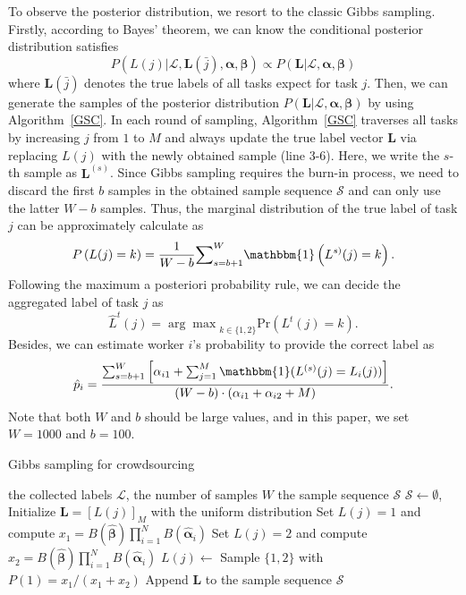 \documentclass{article}
\begin{document}
To observe the posterior distribution, we resort to the classic Gibbs sampling. Firstly, according to Bayes' theorem, we can know the conditional posterior distribution satisfies
\begin{equation}
P(L(j)|\mathcal{L}, \bm{L}(\bar{j}), \bm{\alpha}, \bm{\beta})\propto P(\bm{L}|\mathcal{L}, \bm{\alpha}, \bm{\beta})
\end{equation} 
where $\bm{L}(\bar{j})$ denotes the true labels of all tasks expect for task $j$.
Then, we can generate the samples of the posterior distribution $P(\bm{L}|\mathcal{L}, \bm{\alpha}, \bm{\beta})$ by using Algorithm~\ref{GSC}.
In each round of sampling, Algorithm~\ref{GSC} traverses all tasks by increasing $j$ from $1$ to $M$ and always update the true label vector $\bm{L}$ via replacing $L(j)$ with the newly obtained sample (line 3-6).
Here, we write the $s$-th sample as $\bm{L}^{(s)}$.
Since Gibbs sampling requires the burn-in process, we need to discard the first $b$ samples in the obtained sample sequence $\mathcal{S}$ and can only use the latter $W-b$ samples.
Thus, the marginal distribution of the true label of task $j$ can be approximately calculate as
\begin{equation}
P\left(L(j)=k\right)=\frac{1}{W-b}{\sum}_{s=b+1}^{W}\mathbbm{1}\left(L^{s)}(j)=k\right).
\end{equation}
Following the maximum a posteriori probability rule, we can decide the aggregated label of task $j$ as
\begin{equation}
\hat{L}^{t}(j)={\arg\max}_{k\in\{1,2\}}\textrm{Pr}(L^{t}(j)=k).
\end{equation}
Besides, we can estimate worker $i$'s probability to provide the correct label as
\begin{equation}
\label{p_infer}
\hat{p}_{i}=\frac{\sum_{s=b+1}^{W}\left[\alpha_{i1}+\sum_{j=1}^{M}\mathbbm{1}(L^{(s)}(j)=L_{i}(j))\right]}{(W-b)\cdot(\alpha_{i1}+\alpha_{i2}+M)}.
\end{equation}
Note that both $W$ and $b$ should be large values, and in this paper, we set $W=1000$ and $b=100$.
\begin{algorithm}[tb]
   \caption{Gibbs sampling for crowdsourcing}
   \label{GSC}
   \small
\begin{algorithmic}
   \vspace{0.5mm}
    the collected labels $\mathcal{L}$, the number of samples $W$
    the sample sequence $\mathcal{S}$
   \vspace{0.5mm}
   \STATE $\mathcal{S}\leftarrow\emptyset$, Initialize $\bm{L}=[L(j)]_M$ with the uniform distribution
   \STATE Set $L(j)=1$ and compute $x_1= B(\hat{\bm{\beta}})\prod_{i=1}^{N}B(\hat{\bm{\alpha}}_{i})$
   \STATE Set $L(j)=2$ and compute $x_2= B(\hat{\bm{\beta}})\prod_{i=1}^{N}B(\hat{\bm{\alpha}}_{i})$
   \STATE $L(j)\leftarrow$ Sample $\{1,2\}$ with $P(1)=x_1/(x_1+x_2)$
   \ENDFOR
   \STATE Append $\bm{L}$ to the sample sequence $\mathcal{S}$
   \ENDFOR
\end{algorithmic}
\end{algorithm}
\end{document}

